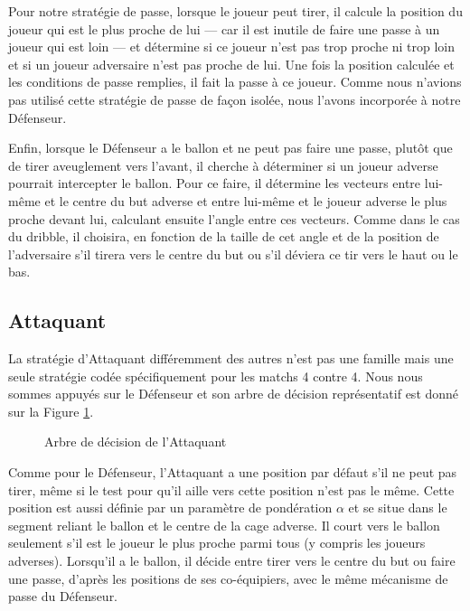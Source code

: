 \documentclass[a4paper,12pt]{article}
\begin{document}
Pour notre stratégie de passe, lorsque le joueur peut tirer, il calcule la position du joueur qui est le plus proche de lui --- car il est inutile de faire une passe à un joueur qui est loin --- et détermine si ce joueur n'est pas trop proche ni trop loin et si un joueur adversaire n'est pas proche de lui. Une fois la position calculée et les conditions de passe remplies, il fait la passe à ce joueur. Comme nous n'avions pas utilisé cette stratégie de passe de façon isolée, nous l'avons incorporée à notre Défenseur.

Enfin, lorsque le Défenseur a le ballon et ne peut pas faire une passe, plutôt que de tirer aveuglement vers l'avant, il cherche à déterminer si un joueur adverse pourrait intercepter le ballon. Pour ce faire, il détermine les vecteurs entre lui-même et le centre du but adverse et entre lui-même et le joueur adverse le plus proche devant lui, calculant ensuite l'angle entre ces vecteurs. Comme dans le cas du dribble, il choisira, en fonction de la taille de cet angle et de la position de l'adversaire s'il tirera vers le centre du but ou s'il déviera ce tir vers le haut ou le bas.

\subsection{Attaquant}

La stratégie d'Attaquant différemment des autres n'est pas une famille mais une seule stratégie codée spécifiquement pour les matchs 4 contre 4. Nous nous sommes appuyés sur le Défenseur et son arbre de décision représentatif est donné sur la Figure \ref{Figure7}. 

\begin{figure}[ht]
\centering

\caption{Arbre de décision de l'Attaquant}
\label{Figure7}
\end{figure}

Comme pour le Défenseur, l'Attaquant a une position par défaut s'il ne peut pas tirer, même si le test pour qu'il aille vers cette position n'est pas le même. Cette position est aussi définie par un paramètre de pondération $\alpha$ et se situe dans le segment reliant le ballon et le centre de la cage adverse. Il court vers le ballon seulement s'il est le joueur le plus proche parmi tous (y compris les joueurs adverses). Lorsqu'il a le ballon, il décide entre tirer vers le centre du but ou faire une passe, d'après les positions de ses co-équipiers, avec le même mécanisme de passe du Défenseur.
\end{document}
